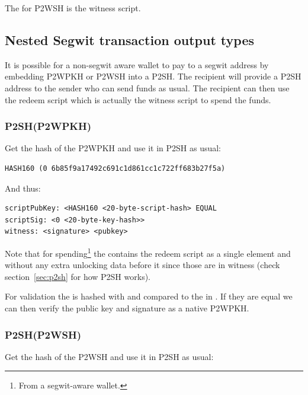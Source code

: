 The  for P2WSH is the witness script.


\subsection*{Nested Segwit transaction output types}
It is possible for a non-segwit aware wallet to pay to a segwit address by embedding P2WPKH or P2WSH into a P2SH. The recipient will provide a P2SH address to the sender who can send funds as usual. The recipient can then use the redeem script which is actually the witness script to spend the funds.

\subsubsection*{P2SH(P2WPKH)}
Get the hash of the P2WPKH  and use it in P2SH as usual:

\begin{emphbox}
\begin{lstlisting}[style=Pseudomath]
HASH160 (0 6b85f9a17492c691c1d861cc1c722ff683b27f5a)
\end{lstlisting}
\end{emphbox}

And thus:

\begin{emphbox}
\begin{lstlisting}[style=Pseudomath]
scriptPubKey: <HASH160 <20-byte-script-hash> EQUAL
scriptSig: <0 <20-byte-key-hash>>
witness: <signature> <pubkey>
\end{lstlisting}
\end{emphbox}

Note that for spending\footnote{From a segwit-aware wallet.} the  contains the redeem script as a single element and without any extra unlocking data before it since those are in witness (check section~\ref{sec:p2sh} for how P2SH works). 

For validation the  is hashed with  and compared to the  in . If they are equal we can then verify the public key and signature as a native P2WPKH.


\subsubsection*{P2SH(P2WSH)}
Get the hash of the P2WSH  and use it in P2SH as usual:

